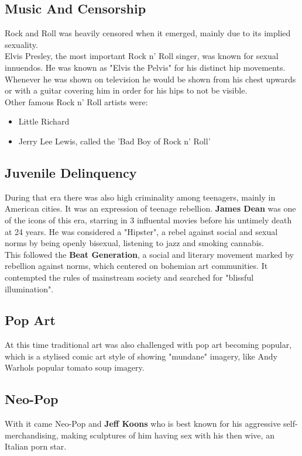 \documentclass{article}
\begin{document}
	\subsection{Music And Censorship}
	Rock and Roll was heavily censored when it emerged, mainly due to its implied sexuality. \\
	Elvis Presley, the most important Rock n' Roll singer, was known for sexual innuendos. He was known as "Elvis the Pelvis" for his distinct hip movements. Whenever he was shown on television he would be shown from his chest upwards or with a guitar covering him in order for his hips to not be visible. \\
	Other famous Rock n' Roll artists were: 
	\begin{itemize}
		\item{Little Richard}
		\item{Jerry Lee Lewis, called the 'Bad Boy of Rock n' Roll'}
	\end{itemize}
	\subsection{Juvenile Delinquency}
	During that era there was also high criminality among teenagers, mainly in American cities. It was an expression of teenage rebellion. \textbf{James Dean} was one of the icons of this era, starring in 3 influental movies before his untimely death at 24 years. He was considered a "Hipster", a rebel against social and sexual norms by being openly bisexual, listening to jazz and smoking cannabis. \\
	This followed the \textbf{Beat Generation}, a social and literary movement marked by rebellion against norms, which centered on bohemian art communities. It contempted the rules of mainstream society and searched for "blissful illumination".
	\subsection{Pop Art}
	At this time traditional art was also challenged with pop art becoming popular, which is a stylised comic art style of showing "mundane" imagery, like Andy Warhols popular tomato soup imagery.
	\subsection{Neo-Pop}
	With it came Neo-Pop and \textbf{Jeff Koons} who is best known for his aggressive self-merchandising, making sculptures of him having sex with his then wive, an Italian porn star. \\
\end{document}
